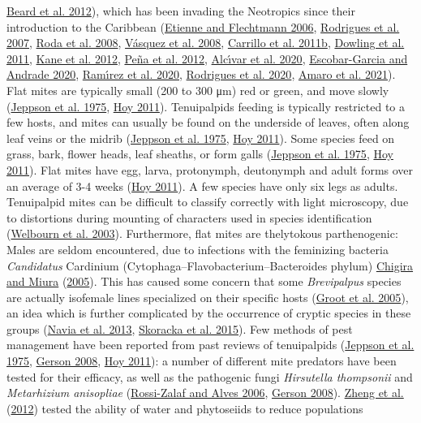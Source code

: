 \documentclass[12pt,final,CPage]{ufthesis}
\begin{document}
{\protect\hyperlink{ref-Beard2012a}{Beard et al. 2012}), which has been invading the Neotropics since their introduction to the Caribbean (\protect\hyperlink{ref-Etienne2006}{Etienne and Flechtmann 2006}, \protect\hyperlink{ref-Rodrigues2007}{Rodrigues et al. 2007}, \protect\hyperlink{ref-Roda2008}{Roda et al. 2008}, \protect\hyperlink{ref-Vasquez2008}{Vásquez et al. 2008}, \protect\hyperlink{ref-Carrillo2011b}{Carrillo et al. 2011b}, \protect\hyperlink{ref-Dowling2011}{Dowling et al. 2011}, \protect\hyperlink{ref-Kane2012}{Kane et al. 2012}, \protect\hyperlink{ref-Pena2012}{Peña et al. 2012}, \protect\hyperlink{ref-Alcivar2020}{Alcı́var et al. 2020}, \protect\hyperlink{ref-EscobarGarcia2020}{Escobar-Garcia and Andrade 2020}, \protect\hyperlink{ref-Ramirez2020}{Ramı́rez et al. 2020}, \protect\hyperlink{ref-Rodrigues2020}{Rodrigues et al. 2020}, \protect\hyperlink{ref-Amaro2021}{Amaro et al. 2021}). Flat mites are typically small (200 to 300 \si{\micro\metre}) red or green, and move slowly (\protect\hyperlink{ref-Jeppson1975}{Jeppson et al. 1975}, \protect\hyperlink{ref-Hoy2011}{Hoy 2011}). Tenuipalpids feeding is typically restricted to a few hosts, and mites can usually be found on the underside of leaves, often along leaf veins or the midrib (\protect\hyperlink{ref-Jeppson1975}{Jeppson et al. 1975}, \protect\hyperlink{ref-Hoy2011}{Hoy 2011}). Some species feed on grass, bark, flower heads, leaf sheaths, or form galls (\protect\hyperlink{ref-Jeppson1975}{Jeppson et al. 1975}, \protect\hyperlink{ref-Hoy2011}{Hoy 2011}). Flat mites have egg, larva, protonymph, deutonymph and adult forms over an average of 3-4 weeks (\protect\hyperlink{ref-Hoy2011}{Hoy 2011}). A few species have only six legs as adults. Tenuipalpid mites can be difficult to classify correctly with light microscopy, due to distortions during mounting of characters used in species identification (\protect\hyperlink{ref-Welbourn2003}{Welbourn et al. 2003}). Furthermore, flat mites are thelytokous parthenogenic: Males are seldom encountered, due to infections with the feminizing bacteria \emph{Candidatus} Cardinium (Cytophaga--Flavobacterium--Bacteroides phylum) \protect\hyperlink{ref-Chigira2005}{Chigira and Miura} (\protect\hyperlink{ref-Chigira2005}{2005}). This has caused some concern that some \emph{Brevipalpus} species are actually isofemale lines specialized on their specific hosts (\protect\hyperlink{ref-Groot2005}{Groot et al. 2005}), an idea which is further complicated by the occurrence of cryptic species in these groups (\protect\hyperlink{ref-Navia2013}{Navia et al. 2013}, \protect\hyperlink{ref-Skoracka2015}{Skoracka et al. 2015}). Few methods of pest management have been reported from past reviews of tenuipalpids (\protect\hyperlink{ref-Jeppson1975}{Jeppson et al. 1975}, \protect\hyperlink{ref-Gerson2008}{Gerson 2008}, \protect\hyperlink{ref-Hoy2011}{Hoy 2011}): a number of different mite predators have been tested for their efficacy, as well as the pathogenic fungi \emph{Hirsutella thompsonii} and \emph{Metarhizium anisopliae} (\protect\hyperlink{ref-RossiZalaf2006}{Rossi-Zalaf and Alves 2006}, \protect\hyperlink{ref-Gerson2008}{Gerson 2008}). \protect\hyperlink{ref-Zheng2012}{Zheng et al.} (\protect\hyperlink{ref-Zheng2012}{2012}) tested the ability of water and phytoseiids to reduce populations }
\end{document}
